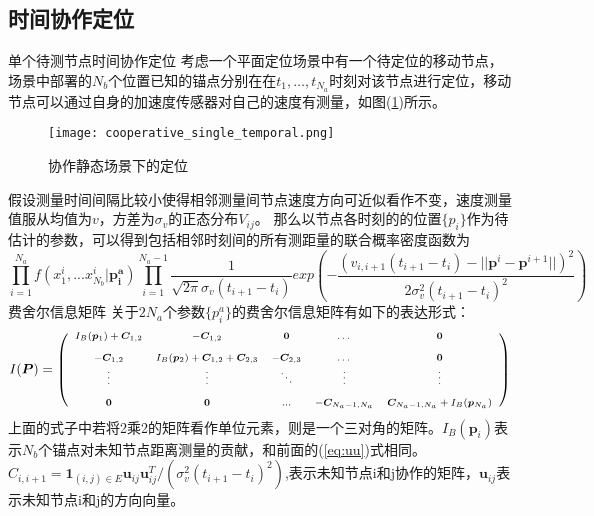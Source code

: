 \subsection[时间协作定位]{时间协作定位}

{单个待测节点时间协作定位}
考虑一个平面定位场景中有一个待定位的移动节点，场景中部署的$N_b$个位置已知的锚点分别在在$t_1,\dots,t_{N_a}$时刻对该节点进行定位，移动节点可以通过自身的加速度传感器对自己的速度有测量，如图(\ref{fig:cooperative_single_temporal})所示。
        \begin{figure}
          \centering
          \texttt{[image: cooperative\_single\_temporal.png]}
          \caption{协作静态场景下的定位}\label{fig:cooperative_single_temporal}
        \end{figure}

假设测量时间间隔比较小使得相邻测量间节点速度方向可近似看作不变，速度测量值服从均值为$v$，方差为$\sigma_{v}$的正态分布$V_{ij}$。
那么以节点各时刻的的位置$\{p_i\}$作为待估计的参数，可以得到包括相邻时刻间的所有测距量的联合概率密度函数为
\begin{equation}\label{eq:single}
\prod_{i=1}^{N_a} f(x^i_1,...x^{i}_{N_b}|\bm{p^a_i})
\prod_{i=1}^{N_a-1}\frac{1}{\sqrt{2\pi}\sigma_v(t_{i+1}-t_i)}
exp(-\frac{(v_{i,i+1}(t_{i+1}-t_i)-||\bm{p}^i-\bm{p}^{i+1}||)^2}{2\sigma_v^2(t_{i+1}-t_i)^2})
\end{equation}
{费舍尔信息矩阵}
关于$2N_a$个参数$\{p_i^a\}$的费舍尔信息矩阵有如下的表达形式：
\begin{equation}\label{eq:time_cooperation_matrix}
\scriptsize{
I(\bm{P})=
\left(
\begin{array}{ccccc}
I_B(\bm{p}_1)+\bm{C}_{1,2}&-\bm{C}_{1,2}&\bm{0}&\dots&\bm{0}\\
&&&&\\
-\bm{C}_{1,2} & I_B(\bm{p}_2)+\bm{C}_{1,2}+\bm{C}_{2,3}&-\bm{C}_{2,3}&\dots&\bm{0}\\
\vdots &\vdots&\ddots &\vdots&\vdots\\
&&&&\\
\bm{0}&\bm{0}&...& -\bm{C}_{N_a-1,N_a}&\bm{C}_{N_a-1,N_a}+I_B(\bm{p}_{N_a})\\
\end{array}
\right)
}
\end{equation}
上面的式子中若将2乘2的矩阵看作单位元素，则是一个三对角的矩阵。$I_B(\bm{p}_i)$表示$N_b$个锚点对未知节点距离测量的贡献，和前面的(\ref{eq:uu})式相同。$C_{i,i+1}=\bm{1}_{(i,j)\in E}\bm{u}_{ij}\bm{u}_{ij}^T/(\sigma_v^2(t_{i+1}-t_i)^2)$,表示未知节点i和j协作的矩阵，$\bm{u}_{ij}$表示未知节点i和j的方向向量。
